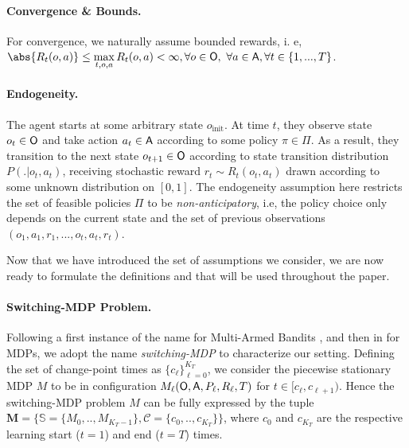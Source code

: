 \documentclass{article} %
\begin{document}
\paragraph{Convergence \& Bounds.} For convergence, we naturally assume bounded rewards, i. e, $\abs{R_t(o, a)} \leq \max\limits_{t, o, a} R_t(o, a)  <\infty, \forall o \in \sO, \ \forall a \in \sA, \forall t \in  \left\lbrace 1,..., T \right\rbrace $. 

\paragraph{Endogeneity.} The agent starts at some arbitrary state $o_{\text{init}}$. At time $t$, they observe state $o_t \in {\mathsf{O}}$ and take action $a_t \in {\mathsf{A}}$ according to some policy $\pi \in \Pi$. As a result, they transition to the next state $o_{t+1} \in {\mathsf{O}}$ according to state transition distribution $P(.|o_t, a_t)$, receiving stochastic reward $r_t \sim R_t(o_t, a_t)$ drawn according to some unknown distribution on $[0, 1]$. The endogeneity assumption here restricts the set of feasible policies $\Pi$ to be \textit{non-anticipatory}, i.e, the policy choice only depends on the current state and the set of previous observations $(o_1, a_1, r_1, ..., o_t, a_t, r_t)$. 

Now that we have introduced the set of assumptions we consider, we are now ready to formulate the definitions and that will be used throughout the paper. 

\paragraph{Switching-MDP Problem.} Following a first instance of the name for Multi-Armed Bandits \cite{garivier2011upper}, and then in \cite{SWUCRL} for MDPs, we adopt the name \textit{switching-MDP} to characterize our setting. Defining the set of change-point times as $\{c_\ell\}_{\ell=0}^{K_T}$, we consider the piecewise stationary MDP $M$ to be in configuration $M_\ell({\mathsf{O}}, {\mathsf{A}}, P_\ell, R_\ell, T)$ for $t \in [c_\ell, c_{\ell+1})$. Hence the switching-MDP problem $M$ can be fully expressed by the tuple $\mathbf{M} = \{\mathbb{S}=\{M_0,..,M_{K_T-1}\}, \mathcal{C}=\{c_0,..,c_{K_T}\}\}$, where $c_0$ and $c_{K_T}$ are the respective learning start ($t=1$) and end ($t=T$) times. 


\end{document}
